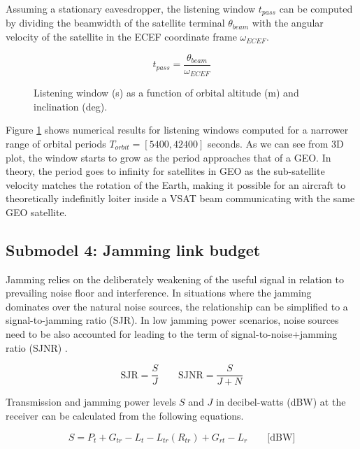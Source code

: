 \documentclass[english, 12pt, a4paper, elec, utf8, a-1b, online]{aaltothesis}
\begin{document}
Assuming a stationary eavesdropper, the listening window ${t_{pass}}$ can be computed by dividing the beamwidth of the satellite terminal $\theta_{beam}$ with the angular velocity of the satellite in the ECEF coordinate frame $\omega_{ECEF}$.

\begin{equation}
  t_{pass} = \frac{\theta_{beam}}{\omega_{ECEF}}
\end{equation}

\begin{figure}[h]
  \centering
  
  \caption{Listening window (s) as a function of orbital altitude (m) and inclination (deg).}
  \label{fig-listening-window}
\end{figure}

Figure \ref{fig-listening-window} shows numerical results for listening windows computed for a narrower range of orbital periods $T_{orbit} = [5400, 42400]$ seconds.
As we can see from 3D plot, the window starts to grow as the period approaches that of a GEO. In theory, the period goes to infinity for satellites in GEO as the sub-satellite velocity matches the rotation of the Earth, making it possible for an aircraft to theoretically indefinitly loiter inside a VSAT beam communicating with the same GEO satellite.

\subsection{Submodel 4: Jamming link budget} \label{ch-results-submodel-4-link-budget}
Jamming relies on the deliberately weakening of the useful signal in relation to prevailing noise floor and interference. In situations where the jamming dominates over the natural noise sources, the relationship can be simplified to a signal-to-jamming ratio (SJR). In low jamming power scenarios, noise sources need to be also accounted for leading to the term of signal-to-noise+jamming ratio (SJNR) \cite{kosola2013digitaalinen}. %

\begin{equation*}
  \text{SJR} = \frac{S}{J} \qquad
  \text{SJNR} = \frac{S}{J+N}
\end{equation*}

Transmission and jamming power levels $S$ and $J$ in decibel-watts (dBW) at the receiver can be calculated from the following equations.

\begin{equation} \label{eq-signal-power-full}
  S = P_t + G_{tr}-L_t-L_{tr}(R_{tr})+G_{rt}-L_r \qquad \text{[dBW]}
\end{equation}
\end{document}
